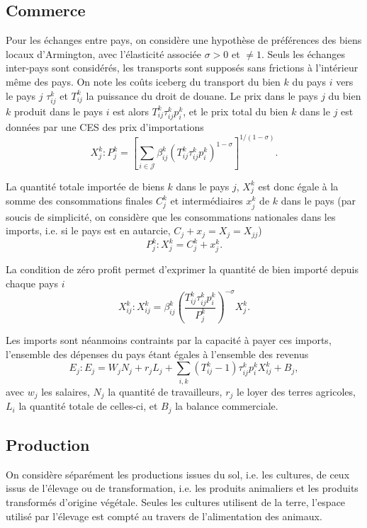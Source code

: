 \subsection{Commerce}

Pour les échanges entre pays, on considère une hypothèse de préférences des biens locaux d’Armington, avec l’élasticité associée $\sigma >0$ et $\neq 1$. Seuls les échanges inter-pays sont considérés, les transports sont supposés sans frictions à l’intérieur même des pays. On note les coûts iceberg du transport du bien $k$ du pays $i$ vers le pays $j$ $\tau_{ij}^k$ et $T_{ij}^k$ la puissance du droit de douane. Le prix dans le pays $j$ du bien $k$ produit dans le pays $i$ est alors $T_{ij}^k \tau_{ij}^k p_i^k$, et le prix total du bien $k$ dans le $j$ est données par une CES des prix d’importations
\begin{equation}
    X_j^k: P_j^k = \left[ \sum_{i \in \mathcal{J}} \beta_{ij}^k \left(T_{ij}^k \tau_{ij}^k p_i^k \right)^{1-\sigma} \right]^{1/(1-\sigma)}.
\end{equation}

La quantité totale importée de biens $k$ dans le pays $j$, $X_j^k$ est donc égale à la somme des consommations finales $C_j^k$ et intermédiaires $x_j^k$ de $k$ dans le pays (par soucis de simplicité, on considère que les consommations nationales dans les imports, i.e. si le pays est en autarcie, $C_j + x_j = X_j = X_{jj}$)
\begin{equation}
    P_j^k: X_j^k = C_j^k + x_j^k.
\end{equation}

La condition de zéro profit permet d’exprimer la quantité de bien importé depuis chaque pays $i$
\begin{equation}
    X_{ij}^k: X_{ij}^k = \beta_{ij}^k \left( \frac{T_{ij}^k \tau_{ij}^k p_i^k}{P_j^k}\right)^{- \sigma} X_{j}^k.
\end{equation}

Les imports sont néanmoins contraints par la capacité à payer ces imports, l’ensemble des dépenses du pays étant égales à l’ensemble des revenus
\begin{equation}
    E_j: E_j = W_j N_j + r_j L_j + \sum_{i,k} \left( T_{ij}^k-1 \right)\tau_{ij}^k p_i^k X_{ij}^k + B_j,
\end{equation}
avec $w_j$ les salaires, $N_j$ la quantité de travailleurs, $r_j$ le loyer des terres agricoles, $L_i$ la quantité totale de celles-ci, et $B_j$ la balance commerciale.

\subsection{Production}
On considère séparément les productions issues du sol, i.e. les cultures, de ceux issus de l’élevage ou de transformation, i.e. les produits animaliers et les produits transformés d’origine végétale. Seules les cultures utilisent de la terre, l’espace utilisé par l’élevage est compté au travers de l’alimentation des animaux.


